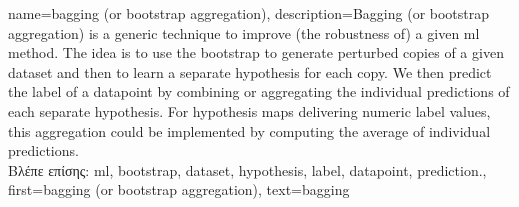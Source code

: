 


{name={bagging (or bootstrap aggregation)},
description={Bagging (or bootstrap aggregation) 
		is a generic technique to improve (the robustness of) a given \gls{ml} method. 
		The idea is to use the \gls{bootstrap} to generate perturbed copies of a given \gls{dataset} 
		and then to learn a separate \gls{hypothesis} for each copy. We then predict the 
		\gls{label} of a \gls{datapoint} by combining or aggregating the individual \gls{prediction}s 
		of each separate \gls{hypothesis}. For \gls{hypothesis} maps delivering numeric \gls{label} 
		values, this aggregation could be implemented by computing the average of individual 
		\gls{prediction}s.\\
		\foreignlanguage{greek}{Βλέπε επίσης:} \gls{ml}, \gls{bootstrap}, \gls{dataset}, \gls{hypothesis}, \gls{label}, \gls{datapoint}, \gls{prediction}.},
		first={bagging (or bootstrap aggregation)},
		text={bagging}  
}


